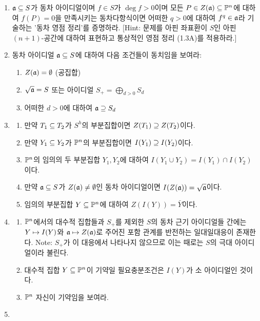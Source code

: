 	
	\begin{enumerate}[label=\tb{2.\arabic*.},itemindent=0mm,itemsep=2mm]
	\item $\mf a\bseq S$가 동차 아이디얼이며 $f\in S$가 $\deg f>0$이며
	모든 $P\in Z(\mf a)\bseq\Pn$에 대하여 $f(P)=0$을 만족시키는 동차다항식이면
	어떠한 $q>0$에 대하여 $f^q\in\mf a$라 기술하는 '동차 영점 정리'를 증명하라.
	[Hint: 문제를 아핀 좌표환이 $S$인 아핀 $(n+1)$-공간에 대하여 표현하고 통상적인 영점 정리 (1.3A)를 적용하라.]
	\item 동차 아이디얼 $\mf a\bseq S$에 대하여 다음 조건들이 동치임을 보여라:
	\begin{enumerate}[label=(\roman*)]
		\item $Z(\mf a)=\es$ (공집합)
		\item $\sqrt{\mf a}=S$ 또는 아이디얼 $S_+=\bigoplus_{d>0}S_d$
		\item 어떠한 $d>0$에 대하여 $\mf a\pseq S_d$
	\end{enumerate}
	\item \begin{enumerate}[label=(\alph*)]
	\item 만약 $T_1\bseq T_2$가 $S^h$의 부분집합이면 $Z(T_1)\pseq Z(T_2)$이다.
	\item 만약 $Y_1\bseq Y_2$가 $\P^n$의 부분집합이면 $I(Y_1)\pseq I(Y_2)$이다.
	\item $\Pn$의 임의의 두 부분집합 $Y_1,Y_2$에 대하여 $I(Y_1\cup Y_2)=I(Y_1)\cap I(Y_2)$이다.
	\item 만약 $\mf a\bseq S$가 $Z(\mf a)\ne\es$인 동차 아이디얼이면 $I(Z(\mf a))=\sqrt{\mf a}$이다.
	\item 임의의 부분집합 $Y\bseq\Pn$에 대하여 $Z(I(Y))=\bar Y$이다.
	\end{enumerate}
	\item \begin{enumerate}[label=(\alph*)]
	\item $\Pn$에서의 대수적 집합들과 $S_+$를 제외한 $S$의 동차 근기 아이디얼들 간에는
	$Y\mt I(Y)$와 $\mf a\mt Z(\mf a)$로 주어진 포함 관계를 반전하는 일대일대응이 존재한다.
	Note: $S_+$가 이 대응에서 나타나지 않으므로 이는 때로는 $S$의  극대 아이디얼이라 불린다.
	\item 대수적 집합 $Y\bseq\Pn$이 기약일 필요충분조건은 $I(Y)$가 소 아이디얼인 것이다.
	\item $\Pn$ 자신이 기약임을 보여라.
	\end{enumerate}
	\item \begin{enumerate}[label=(\alph*)]

\end{enumerate}
\end{enumerate}
